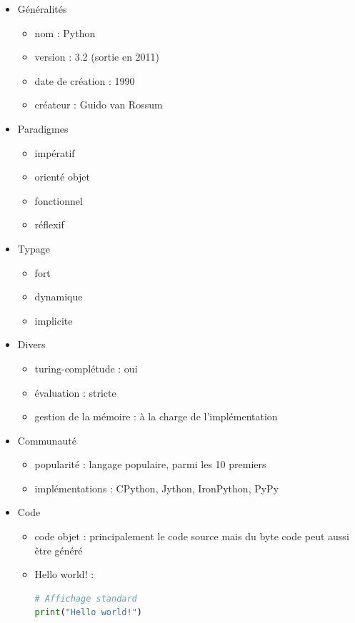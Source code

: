 \renewcommand{\labelitemi}{\textbullet}
\begin{itemize}
\item Généralités
	\begin{itemize}
	\item nom : Python
	\item version : 3.2 (sortie en 2011)
	\item date de création : 1990
	\item créateur : Guido van Rossum\\
	\end{itemize}
\item Paradigmes
	\begin{itemize}
	\item impératif
	\item orienté objet
	\item fonctionnel
	\item réflexif\\
	\end{itemize}
\item Typage
	\begin{itemize}
	\item fort
	\item dynamique
	\item implicite\\
	\end{itemize}
\item Divers
	\begin{itemize}
	\item turing-complétude : oui
	\item évaluation : stricte
	\item gestion de la mémoire : à la charge de l'implémentation\\
	\end{itemize}
\item Communauté
	\begin{itemize}
	\item popularité : langage populaire, parmi les 10 premiers
	\item implémentations : CPython, Jython, IronPython, PyPy\\
	\end{itemize}
\item Code
	\begin{itemize}
	\item code objet : principalement le code source mais du byte code peut aussi être généré
	\item Hello world! :
\begin{lstlisting}[language=python]
# Affichage standard
print("Hello world!")
\end{lstlisting}
	\end{itemize}
\end{itemize}
